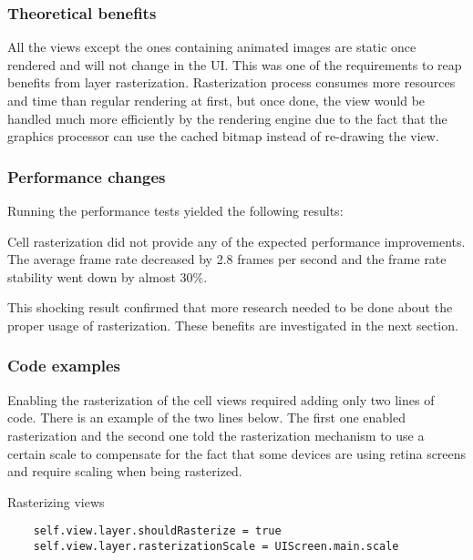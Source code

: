 \documentclass[a4paper,12pt]{article}
\begin{document}
\subsubsection{Theoretical benefits}
All the views except the ones containing animated images are static once rendered and will not change in the UI. This was one of the requirements to reap benefits from layer rasterization. Rasterization process consumes more resources and time than regular rendering at first, but once done, the view would be handled much more efficiently by the rendering engine due to the fact that the graphics processor can use the cached bitmap instead of re-drawing the view.\cite{MovingPixelsOntoTheScreen}

\subsubsection{Performance changes}
Running the performance tests yielded the following results:

Cell rasterization did not provide any of the expected performance improvements. The average frame rate decreased by 2.8 frames per second and the frame rate stability went down by almost 30\%.

This shocking result confirmed that more research needed to be done about the proper usage of rasterization. These benefits are investigated in the next section.

\subsubsection{Code examples}
Enabling the rasterization of the cell views required adding only two lines of code. There is an example of the two lines below. The first one enabled rasterization and the second one told the rasterization mechanism to use a certain scale to compensate for the fact that some devices are using retina screens and require scaling when being rasterized.
\begin{listing}[H]
  \caption{Rasterizing views}
  \begin{verbatim}
    self.view.layer.shouldRasterize = true
    self.view.layer.rasterizationScale = UIScreen.main.scale
  \end{verbatim}
\end{listing}

\end{document}
